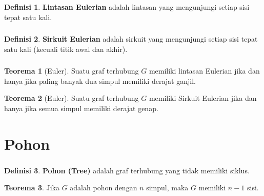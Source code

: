 \documentclass[aspectratio=169]{beamer}
\theoremstyle{definition}
\newtheorem{definisi}{Definisi}
\newtheorem{teorema}{Teorema}
\begin{document}
\begin{frame}
  \frametitle{\insertsection}
  \framesubtitle{\insertsubsection}
  \begin{definisi}
    \textbf{Lintasan Eulerian} adalah lintasan yang mengunjungi setiap sisi tepat satu kali. 
  \end{definisi}
\end{frame}

\begin{frame}
  \frametitle{\insertsection}
  \framesubtitle{\insertsubsection}
  \begin{definisi}
    \textbf{Sirkuit Eulerian} adalah sirkuit yang mengunjungi setiap sisi tepat satu kali (kecuali titik awal dan akhir). 
  \end{definisi}
  \begin{center}
    
  \end{center}
\end{frame}

\begin{frame}
  \frametitle{\insertsection}
  \framesubtitle{\insertsubsection}
  \begin{teorema}[Euler]
    Suatu graf terhubung $G$ memiliki lintasan Eulerian jika dan hanya jika paling banyak dua simpul memiliki derajat ganjil.
  \end{teorema}
  \begin{teorema}[Euler]
    Suatu graf terhubung $G$ memiliki Sirkuit Eulerian jika dan hanya jika semua simpul memiliki derajat genap.
  \end{teorema}
\end{frame}

\section{Pohon}
\begin{frame}
  \frametitle{\insertsection}
  \begin{definisi}
    \textbf{Pohon (Tree)} adalah graf terhubung yang tidak memiliki siklus.
  \end{definisi}
  \begin{teorema}
    Jika $G$ adalah pohon dengan $n$ simpul, maka $G$ memiliki $n-1$ sisi.
  \end{teorema}
\end{frame}
\end{document}
